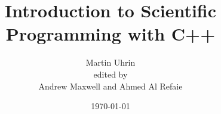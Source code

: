 \newcommand{\warnblock}[1]{%
  \begin{warnblocke}#1\end{warnblocke}
} %

\newcommand{\cout}[1]{%
 Output: \pbox[t]{\textwidth}{\ttfamily\fontsize{9}{10}\selectfont{}#1}
}

\newenvironment{doitemize}[0]{%
  \begin{itemize}}%
  {\end{itemize}} %




\title{Introduction to Scientific Programming with C++}
\author{Martin Uhrin\\edited by\\Andrew Maxwell and Ahmed Al Refaie}
\date{\today}